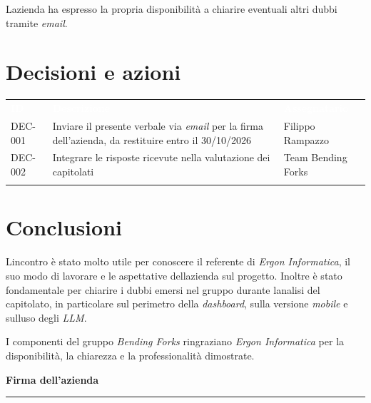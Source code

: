 \documentclass[12pt,a4paper]{article}
\begin{document}
L\textquotesingle azienda ha espresso la propria disponibilità a chiarire eventuali altri dubbi tramite \emph{email}.

\hypertarget{decisioni-e-azioni}{%
\section{Decisioni e azioni}}

\begin{center}
\begin{tabularx}{\linewidth}{>{\hsize=0.511\hsize\raggedright\arraybackslash}X>{\hsize=1.675\hsize\raggedright\arraybackslash}X>{\hsize=0.814\hsize\raggedright\arraybackslash}X}
\rowcolor{bfblue}\textcolor{white}{\textbf{ID}} & \textcolor{white}{\textbf{Descrizione}} & \textcolor{white}{\textbf{Assegnatario}} \\
DEC-001 & Inviare il presente verbale via \emph{email} per la firma dell'azienda, da restituire entro il 30/10/2026 & Filippo Rampazzo\\ \arrayrulecolor{bfline}\hline
DEC-002 & Integrare le risposte ricevute nella valutazione dei capitolati & Team Bending Forks \\ \arrayrulecolor{bfline}\hline
\end{tabularx}
\end{center}

\hypertarget{conclusioni}{%
\section{Conclusioni}}

L\textquotesingle incontro è stato molto utile per conoscere il referente di \emph{Ergon Informatica}, il suo modo di lavorare e le aspettative dell\textquotesingle azienda sul progetto. Inoltre è stato fondamentale per chiarire i dubbi emersi nel gruppo durante l\textquotesingle analisi del capitolato, in particolare sul perimetro della \emph{dashboard}, sulla versione \emph{mobile} e sull\textquotesingle uso degli \emph{LLM}.

I componenti del gruppo \emph{Bending Forks} ringraziano \emph{Ergon Informatica} per la disponibilità, la chiarezza e la professionalità dimostrate.


\begin{flushright}
\textbf{Firma dell'azienda}\\[22pt]
\rule{60mm}{0.5pt}
\end{flushright}
\end{document}
